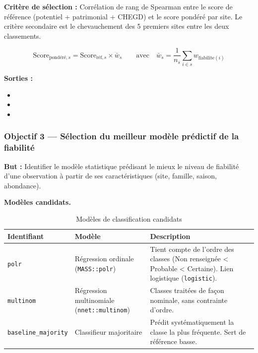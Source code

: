 \documentclass[11pt,a4paper]{article}
\begin{document}
\textbf{Critère de sélection :} Corrélation de rang de Spearman entre le score de référence
(potentiel + patrimonial + CHEGD) et le score pondéré par site.
Le critère secondaire est le chevauchement des 5 premiers sites entre les deux classements.

\begin{formulebox}
  \[
    \text{Score}_{\text{pondéré}, s} = \text{Score}_{\text{réf}, s} \times \bar{w}_s
    \qquad \text{avec} \quad
    \bar{w}_s = \frac{1}{n_s}\sum_{i \in s} w_{\text{fiabilite}(i)}
  \]
\end{formulebox}

\textbf{Sorties :}
\begin{itemize}[leftmargin=1.2cm]
  \item {}
  \item {}
  \item {}
\end{itemize}

\subsubsection{Objectif 3 — Sélection du meilleur modèle prédictif de la fiabilité}

\textbf{But :} Identifier le modèle statistique prédisant le mieux le niveau de fiabilité
d'une observation à partir de ses caractéristiques (site, famille, saison, abondance).

\medskip
\noindent\textbf{Modèles candidats.}\par

\begin{table}[htbp]
  \centering
  \caption{Modèles de classification candidats}
  \begin{tabularx}{\textwidth}{llX}
    \toprule
    \textbf{Identifiant} & \textbf{Modèle} & \textbf{Description} \\
    \midrule
    \texttt{polr} & Régression ordinale (\texttt{MASS::polr}) & Tient compte de l'ordre des classes (Non renseignée < Probable < Certaine). Lien logistique (\texttt{logistic}). \\
    \texttt{multinom} & Régression multinomiale (\texttt{nnet::multinom}) & Classes traitées de façon nominale, sans contrainte d'ordre. \\
    \texttt{baseline\_majority} & Classifieur majoritaire & Prédit systématiquement la classe la plus fréquente. Sert de référence basse. \\
    \bottomrule
  \end{tabularx}
\end{table}
\end{document}
